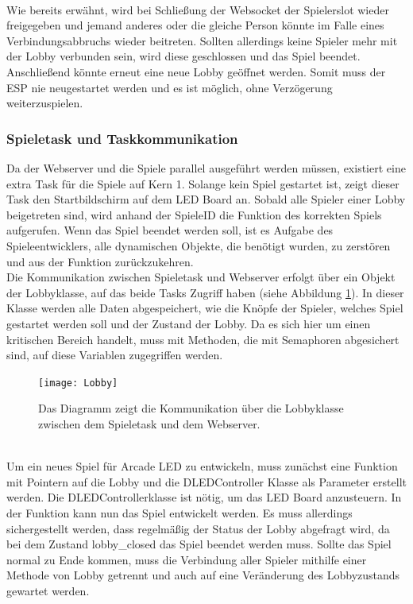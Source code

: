 \documentclass[12pt,a4paper]{article}
\begin{document}
\vspace{1ex}\\
Wie bereits erwähnt, wird bei Schließung der Websocket der Spielerslot wieder freigegeben und jemand anderes oder die gleiche Person könnte im Falle eines Verbindungsabbruchs wieder beitreten. Sollten allerdings keine Spieler mehr mit der Lobby verbunden sein, wird diese geschlossen und das Spiel beendet. Anschließend könnte erneut eine neue Lobby geöffnet werden. Somit muss der ESP nie neugestartet werden und es ist möglich, ohne Verzögerung weiterzuspielen.



\subsubsection{Spieletask und Taskkommunikation}
Da der Webserver und die Spiele parallel ausgeführt werden müssen, existiert eine extra Task für die Spiele auf Kern 1. Solange kein Spiel gestartet ist, zeigt dieser Task den Startbildschirm auf dem LED Board an. Sobald alle Spieler einer Lobby beigetreten sind, wird anhand der SpieleID die Funktion des korrekten Spiels aufgerufen. Wenn das Spiel beendet werden soll, ist es Aufgabe des Spieleentwicklers, alle dynamischen Objekte, die benötigt wurden, zu zerstören und aus der Funktion zurückzukehren.
\vspace{1ex}\\
Die Kommunikation zwischen Spieletask und Webserver erfolgt über ein Objekt der Lobbyklasse, auf das beide Tasks Zugriff haben (siehe Abbildung \ref{fig:Lobby}). In dieser Klasse werden alle Daten abgespeichert, wie die Knöpfe der Spieler, welches Spiel gestartet werden soll und der Zustand der Lobby. Da es sich hier um einen kritischen Bereich handelt, muss mit Methoden, die mit Semaphoren abgesichert sind, auf diese Variablen zugegriffen werden.
\begin{figure}[h]
\centering
\texttt{[image: Lobby]}
\caption{\label{fig:Lobby}Das Diagramm zeigt die Kommunikation über die Lobbyklasse zwischen dem Spieletask und dem Webserver.}
\end{figure}
\vspace{1ex}\\
Um ein neues Spiel für Arcade LED zu entwickeln, muss zunächst eine Funktion mit Pointern auf die Lobby und die DLEDController Klasse als Parameter erstellt werden. Die DLEDControllerklasse ist nötig, um das LED Board anzusteuern. In der Funktion kann nun das Spiel entwickelt werden. Es muss allerdings sichergestellt werden, dass regelmäßig der Status der Lobby abgefragt wird, da bei dem Zustand \dq lobby\_closed\dq{} das Spiel beendet werden muss. Sollte das Spiel normal zu Ende kommen, muss die Verbindung aller Spieler mithilfe einer Methode von Lobby getrennt und auch auf eine Veränderung des Lobbyzustands gewartet werden.
\end{document}
